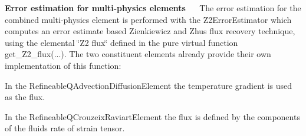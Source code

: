 \begin{DoxyItemize}
\item {\bfseries Error estimation for multi-\/physics elements}~\newline
~\newline
 The error estimation for the combined multi-\/physics element is performed with the {\ttfamily Z2\+Error\+Estimator} which computes an error estimate based Zienkiewicz and Zhu\textquotesingle{}s flux recovery technique, using the elemental \char`\"{}\+Z2 flux\char`\"{} defined in the pure virtual function {\ttfamily get\+\_\+\+Z2\+\_\+flux}(...). The two constituent elements already provide their own implementation of this function\+: ~\newline
~\newline

\begin{DoxyItemize}
\item In the {\ttfamily Refineable\+Q\+Advection\+Diffusion\+Element} the temperature gradient is used as the flux.~\newline
~\newline

\item In the {\ttfamily Refineable\+Q\+Crouzeix\+Raviart\+Element} the flux is defined by the components of the fluid\textquotesingle{}s rate of strain tensor. ~\newline
~\newline


\end{DoxyItemize}
\end{DoxyItemize}
